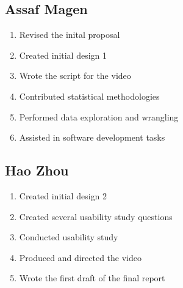 \documentclass{sigchi}
\begin{document}
\subsection{Assaf Magen}

\begin{enumerate}
    \item Revised the inital proposal
    \item Created initial design 1
    \item Wrote the script for the video
    \item Contributed statistical methodologies
    \item Performed data exploration and wrangling
    \item Assisted in software development tasks
\end{enumerate}

\subsection{Hao Zhou}

\begin{enumerate}
    \item Created initial design 2
    \item Created several usability study questions
    \item Conducted usability study
    \item Produced and directed the video
    \item Wrote the first draft of the final report
\end{enumerate}
\end{document}
